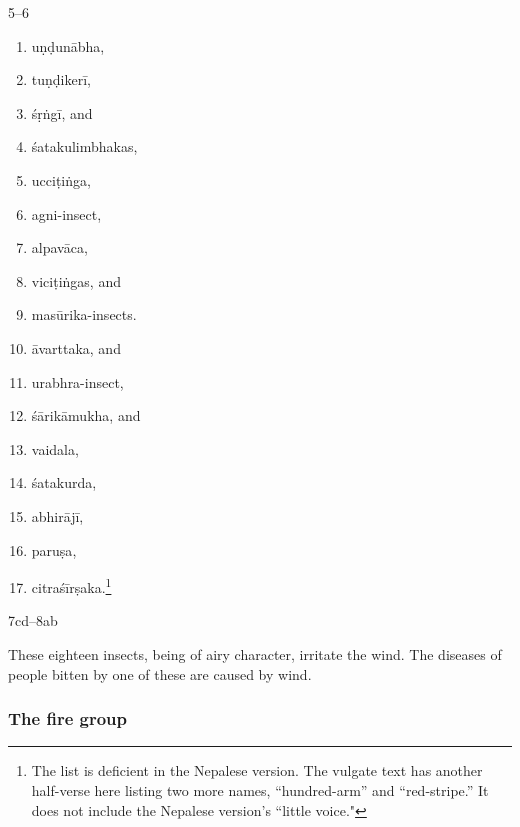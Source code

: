 \begin{translation}
\item[5--6]
\begin{multicols}{2}
\begin{enumerate}
    \item \Gls{uṇḍunābha},
    \item \Gls{tuṇḍikerī},
    \item \Gls{śṛṅgī}, and
    \item \Glspl{śatakulimbhaka},
    \item \Gls{ucciṭiṅga},
    \item \Gls{agni-insect},
    \item \Gls{alpavāca},
    \item \Glspl{viciṭiṅga},
    and
    \item \Glspl{masūrika-insect}.
    \item \Gls{āvarttaka}, and
    \item \Gls{urabhra-insect},
    \item \Gls{śārikāmukha}, and
    \item \Gls{vaidala},
    \item \Gls{śatakurda},
    \item \Gls{abhirājī},
    \item \Gls{paruṣa},
    \item \Gls{citraśīrṣaka}.\footnote{The list is deficient in the Nepalese version.  
    The
        vulgate text has another half-verse here listing two more names,
         “hundred-arm” and  “red-stripe.” It does
        not include the Nepalese version's  “little voice."}
\end{enumerate}
\end{multicols}

\item[7cd--8ab]

These eighteen insects, being of airy character, irritate the
wind.
The diseases of people bitten by one of these are caused by wind.

\subsubsection{The fire group}


\end{translation}
